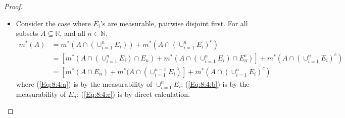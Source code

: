 \begin{proof}
\begin{itemize}
\item
Consider the case where $E_i$'s are measurable, pairwise disjoint first.
For all subsets $A\subseteq\mathbb{R}$, and all $n\in\mathbb{N}$,
\begin{subequations}
\begin{align}
m^*(A)&=
m^*(A\cap (\cup_{i=1}^n E_i))+
m^*(A\cap (\cup_{i=1}^n E_i)^c)\label{Eq:8:4:a}\\
&=[m^*(A\cap (\cup_{i=1}^n E_i)\cap E_n)
+
m^*(A\cap (\cup_{i=1}^n E_i)\cap E_n^c)]
+m^*(A\cap (\cup_{i=1}^n E_i)^c)\label{Eq:8:4:b}\\
&=[m^*(A\cap E_n)
+
m^*(A\cap (\cup_{i=1}^{n-1} E_i)]
+m^*(A\cap (\cup_{i=1}^n E_i)^c)\label{Eq:8:4:c}
\end{align}
\end{subequations}
where (\ref{Eq:8:4:a}) is by the measurability of $\cup_{i=1}^n E_i$;
(\ref{Eq:8:4:b}) is by the measurability of $E_n$;
(\ref{Eq:8:4:c}) is by direct calculation.


\end{itemize}
\end{proof}
